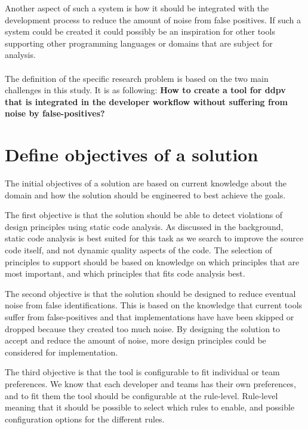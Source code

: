 \documentclass{report}
\begin{document}
Another aspect of such a system is how it should be integrated with the development process to reduce the amount of noise from false positives. If such a system could be created it could possibly be an inspiration for other tools supporting other programming languages or domains that are subject for analysis. \\

\\ The definition of the specific research problem is based on the two main challenges in this study. It is as following: \textbf{How to create a tool for \gls{ddpv} that is integrated in the developer workflow without suffering from noise by false-positives?}


\section{Define objectives of a solution}
\label{objectives-of-solution}

The initial objectives of a solution are based on current knowledge about the domain and how the solution should be engineered to best achieve the goals. 

The first objective is that the solution should be able to detect violations of design principles using static code analysis. As discussed in the background, static code analysis is best suited for this task as we search to improve the source code itself, and not dynamic quality aspects of the code. The selection of principles to support should be based on knowledge on which principles that are most important, and which principles that fits code analysis best. 

The second objective is that the solution should be designed to reduce eventual noise from false identifications. This is based on the knowledge that current tools suffer from false-positives and that implementations have have been skipped or dropped because they created too much noise. By designing the solution to accept and reduce the amount of noise, more design principles could be considered for implementation.

The third objective is that the tool is configurable to fit individual or team preferences. We know that each developer and teams has their own preferences, and to fit them the tool should be configurable at the rule-level. Rule-level meaning that it should be possible to select which rules to enable, and possible configuration options for the different rules.
\end{document}
